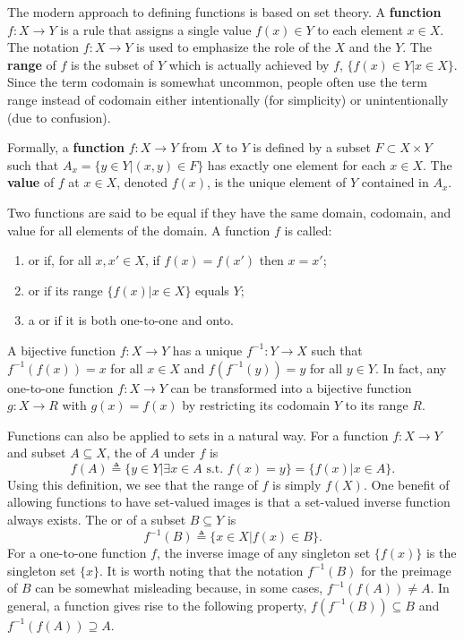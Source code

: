 The modern approach to defining functions is based on set theory.
A \textbf{function} $f \colon X\rightarrow Y$ is a rule that assigns a single value $f(x)\in Y$ to each element $x\in X$.
The notation $f \colon X \rightarrow Y$ is used to emphasize the role of the  $X$ and the  $Y$.
The \textbf{range} of $f$ is the subset of $Y$ which is actually achieved by $f$, $\{f(x) \in Y | x\in X \}$.
Since the term codomain is somewhat uncommon, people often use the term range instead of codomain either intentionally (for simplicity) or unintentionally (due to confusion).
\begin{definition}
Formally, a \textbf{function} $f \colon X \rightarrow Y$ from $X$ to $Y$ is defined by a subset $F \subset X \times Y$ such that $A_x = \{ y\in Y | (x,y)\in F \}$ has exactly one element for each $x\in X$.
The \textbf{value} of $f$ at $x\in X$, denoted $f(x)$, is the unique element of $Y$ contained in $A_x$.
\end{definition}

Two functions are said to be equal if they have the same domain, codomain, and value for all elements of the domain.
A function $f$ is called:
\begin{enumerate}
\item {} or  if, for all $x,x'\in X$, if $f(x)=f(x')$ then $x=x'$;
\item {} or  if its range $\{ f(x) | x\in X\}$ equals $Y$;
\item a  or  if it is both one-to-one and onto.
\end{enumerate}
A bijective function $f \colon X\rightarrow Y$ has a unique  $f^{-1} \colon Y\rightarrow X$ such that $f^{-1}(f(x)) = x$ for all $x\in X$ and $f(f^{-1}(y)) = y$ for all $y\in Y$.
In fact, any one-to-one function $f \colon X\rightarrow Y$ can be transformed into a bijective function $g \colon X \rightarrow R$ with $g(x)=f(x)$ by restricting its codomain $Y$ to its range $R$.

Functions can also be applied to sets in a natural way.
For a function $f \colon X\rightarrow Y$ and subset $A\subseteq X$, the  of $A$ under $f$ is
\[ f(A) \triangleq \{ y\in Y | \exists x\in A \textrm{ s.t. } f(x)=y\} = \{f(x) | x\in A\}. \]
Using this definition, we see that the range of $f$ is simply $f(X)$.
One benefit of allowing functions to have set-valued images is that a set-valued inverse function always exists.
The  or  of a subset $B\subseteq Y$ is
\[ f^{-1}(B) \triangleq \{ x\in X | f(x)\in B\}. \]
For a one-to-one function $f$, the inverse image of any singleton set $\{ f(x) \}$ is the singleton set $\{ x \}$.
It is worth noting that the notation $f^{-1}(B)$ for the preimage of $B$ can be somewhat misleading because, in some cases, $f^{-1}(f(A)) \neq A$.
In general, a function gives rise to the following property, $f(f^{-1}(B)) \subseteq B$ and $f^{-1}(f(A)) \supseteq A$.


